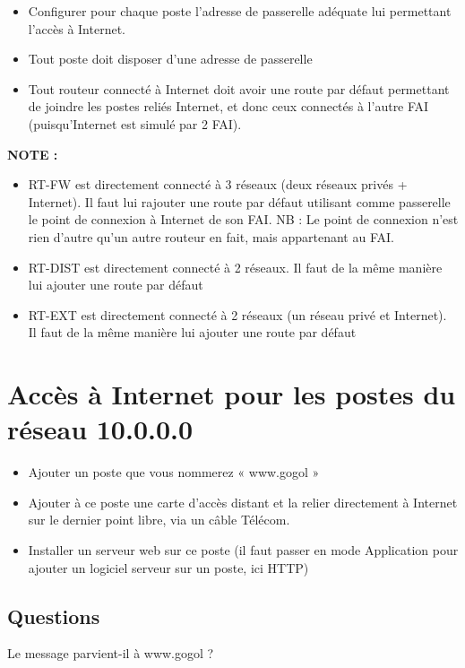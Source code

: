 \documentclass[10pt,a4paper]{article}
\begin{document}
\begin{itemize}
\item Configurer pour chaque poste l’adresse de passerelle adéquate lui permettant l’accès à Internet.
\bigbreak
\item Tout poste doit disposer d’une adresse de passerelle
\bigbreak
\item Tout routeur connecté à Internet doit avoir une route par défaut permettant de joindre les postes reliés Internet, et donc ceux connectés à l’autre FAI (puisqu’Internet est simulé par 2 FAI).
\end{itemize}
\bigbreak
\textbf{NOTE :} 
\bigbreak
\begin{itemize}
\item RT-FW est directement connecté à 3 réseaux (deux réseaux privés + Internet). Il faut lui rajouter une route par défaut utilisant comme passerelle le point de connexion à Internet de son FAI.
\newline
 NB : Le point de connexion n’est rien d’autre qu’un autre routeur en fait, mais appartenant au FAI.
\bigbreak
\item RT-DIST est directement connecté à 2 réseaux. Il faut de la même manière lui ajouter une route par défaut
\bigbreak
\item RT-EXT est directement connecté à 2 réseaux (un réseau privé et Internet). Il faut de la même manière lui ajouter une route par défaut
\end{itemize}
\newpage
\section{Accès à Internet pour les postes du réseau 10.0.0.0}
\begin{itemize}
\bigbreak
\item Ajouter un poste que vous nommerez « www.gogol »
\bigbreak
\item Ajouter à ce poste une carte d’accès distant et la relier directement à Internet sur le dernier point libre, via un câble Télécom.
\bigbreak
\item Installer un serveur web sur ce poste (il faut passer en mode Application pour ajouter un logiciel serveur sur un poste, ici HTTP)
\end{itemize}

\subsection{Questions}
\bigbreak
Le message parvient-il à www.gogol ?
\end{document}
